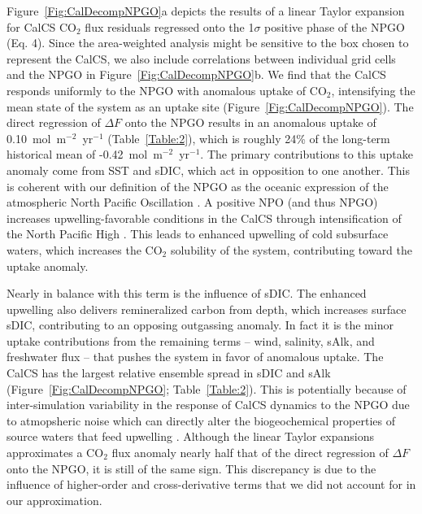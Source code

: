 \documentclass[hvmath, online,bgd]{copernicus_discussions}
\begin{document}
Figure~\ref{Fig:CalDecompNPGO}a depicts the results of a linear Taylor expansion for CalCS CO$_{2}$ flux residuals regressed onto the 1$\sigma$ positive phase of the NPGO (Eq. 4). Since the area-weighted analysis might be sensitive to the box chosen to represent the CalCS, we also include correlations between individual grid cells and the NPGO in Figure~\ref{Fig:CalDecompNPGO}b. We find that the CalCS responds uniformly to the NPGO with anomalous uptake of CO$_{2}$, intensifying the mean state of the system as an uptake site (Figure~\ref{Fig:CalDecompNPGO}). The direct regression of $\Delta F$ onto the NPGO results in an anomalous uptake of 0.10~mol~m$^{-2}$~yr$^{-1}$ (Table~\ref{Table:2}), which is roughly 24\% of the long-term historical mean of -0.42~mol~m$^{-2}$~yr$^{-1}$. The primary contributions to this uptake anomaly come from SST and sDIC, which act in opposition to one another. This is coherent with our definition of the NPGO as the oceanic expression of the atmospheric North Pacific Oscillation \citep[NPO;][]{DiLorenzo:2008}. A positive NPO (and thus NPGO) increases upwelling-favorable conditions in the CalCS through intensification of the North Pacific High \citep{DiLorenzo:2008}. This leads to enhanced upwelling of cold subsurface waters, which increases the CO$_{2}$ solubility of the system, contributing toward the uptake anomaly. 

Nearly in balance with this term is the influence of sDIC. The enhanced upwelling also delivers remineralized carbon from depth, which increases surface sDIC, contributing to an opposing outgassing anomaly. In fact it is the minor uptake contributions from the remaining terms -- wind, salinity, sAlk, and freshwater flux -- that pushes the system in favor of anomalous uptake. The CalCS has the largest relative ensemble spread in sDIC and sAlk (Figure~\ref{Fig:CalDecompNPGO}; Table~\ref{Table:2}). This is potentially because of inter-simulation variability in the response of CalCS dynamics to the NPGO due to atmopsheric noise \citep[as in the case of ENSO in][]{Deser:2017, Deser:2018} which can directly alter the biogeochemical properties of source waters that feed upwelling \citep{PozoBuil:2017}. Although the linear Taylor expansions approximates a CO$_{2}$ flux anomaly nearly half that of the direct regression of $\Delta F$ onto the NPGO, it is still of the same sign. This discrepancy is due to the influence of higher-order and cross-derivative terms that we did not account for in our approximation.
\end{document}
